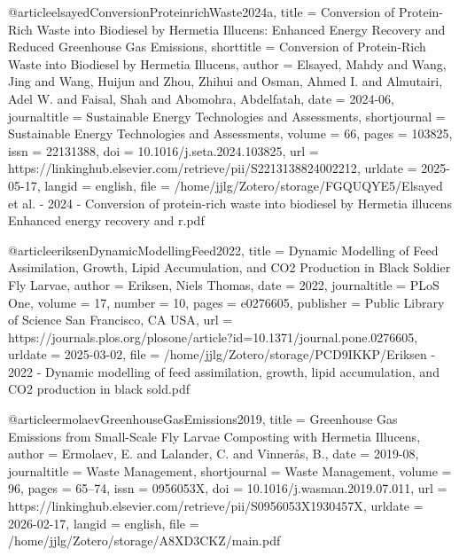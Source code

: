 {{{@article{elsayedConversionProteinrichWaste2024a,
  title = {Conversion of Protein-Rich Waste into Biodiesel by {{Hermetia}} Illucens: {{Enhanced}} Energy Recovery and Reduced Greenhouse Gas Emissions},
  shorttitle = {Conversion of Protein-Rich Waste into Biodiesel by {{Hermetia}} Illucens},
  author = {Elsayed, Mahdy and Wang, Jing and Wang, Huijun and Zhou, Zhihui and Osman, Ahmed I. and Almutairi, Adel W. and Faisal, Shah and Abomohra, Abdelfatah},
  date = {2024-06},
  journaltitle = {Sustainable Energy Technologies and Assessments},
  shortjournal = {Sustainable Energy Technologies and Assessments},
  volume = {66},
  pages = {103825},
  issn = {22131388},
  doi = {10.1016/j.seta.2024.103825},
  url = {https://linkinghub.elsevier.com/retrieve/pii/S2213138824002212},
  urldate = {2025-05-17},
  langid = {english},
  file = {/home/jjlg/Zotero/storage/FGQUQYE5/Elsayed et al. - 2024 - Conversion of protein-rich waste into biodiesel by Hermetia illucens Enhanced energy recovery and r.pdf}
}

@article{eriksenDynamicModellingFeed2022,
  title = {Dynamic Modelling of Feed Assimilation, Growth, Lipid Accumulation, and {{CO2}} Production in Black Soldier Fly Larvae},
  author = {Eriksen, Niels Thomas},
  date = {2022},
  journaltitle = {PLoS One},
  volume = {17},
  number = {10},
  pages = {e0276605},
  publisher = {Public Library of Science San Francisco, CA USA},
  url = {https://journals.plos.org/plosone/article?id=10.1371/journal.pone.0276605},
  urldate = {2025-03-02},
  file = {/home/jjlg/Zotero/storage/PCD9IKKP/Eriksen - 2022 - Dynamic modelling of feed assimilation, growth, lipid accumulation, and CO2 production in black sold.pdf}
}

@article{ermolaevGreenhouseGasEmissions2019,
  title = {Greenhouse Gas Emissions from Small-Scale Fly Larvae Composting with {{Hermetia}} Illucens},
  author = {Ermolaev, E. and Lalander, C. and Vinnerås, B.},
  date = {2019-08},
  journaltitle = {Waste Management},
  shortjournal = {Waste Management},
  volume = {96},
  pages = {65--74},
  issn = {0956053X},
  doi = {10.1016/j.wasman.2019.07.011},
  url = {https://linkinghub.elsevier.com/retrieve/pii/S0956053X1930457X},
  urldate = {2026-02-17},
  langid = {english},
  file = {/home/jjlg/Zotero/storage/A8XD3CKZ/main.pdf}
}

}}}
